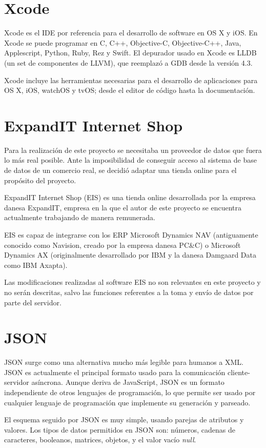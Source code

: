 \section{Xcode}
Xcode es el IDE por referencia para el desarrollo de software en OS X y iOS. En Xcode se puede programar en C, C++, Objective-C, Objective-C++, Java, Applescript, Python, Ruby, Rez y Swift. El depurador usado en Xcode es LLDB (un set de componentes de LLVM), que reemplazó a GDB desde la versión 4.3.

Xcode incluye las herramientas necesarias para el desarrollo de aplicaciones para OS X, iOS, watchOS y tvOS; desde el editor de código hasta la documentación.

\section{ExpandIT Internet Shop}
Para la realización de este proyecto se necesitaba un proveedor de datos que fuera lo más real posible. Ante la imposibilidad de conseguir acceso al sistema de base de datos de un comercio real, se decidió adaptar una tienda online para el propósito del proyecto.

ExpandIT Internet Shop \cite{EIS} (EIS) es una tienda online desarrollada por la empresa danesa ExpandIT, empresa en la que el autor de este proyecto se encuentra actualmente trabajando de manera remunerada.

EIS es capaz de integrarse con los ERP Microsoft Dynamics NAV (antiguamente conocido como Navision, creado por la empresa danesa PC\&C) o Microsoft Dynamics AX (originalmente desarrollado por IBM y la danesa Damgaard Data como IBM Axapta).

Las modificaciones realizadas al software EIS no son relevantes en este proyecto y no serán descritas, salvo las funciones referentes a la toma y envío de datos por parte del servidor.

\section{JSON}
JSON \cite{JSON} surge como una alternativa mucho más legible para humanos a XML. JSON es actualmente el principal formato usado para la comunicación cliente-servidor asíncrona. Aunque deriva de JavaScript, JSON es un formato independiente de otros lenguajes de programación, lo que permite ser usado por cualquier lenguaje de programación que implemente su generación y parseado.

El esquema seguido por JSON es muy simple, usando parejas de atributos y valores. Los tipos de datos permitidos en JSON son: números, cadenas de caracteres, booleanos, matrices, objetos, y el valor vacío \textit{null}.

